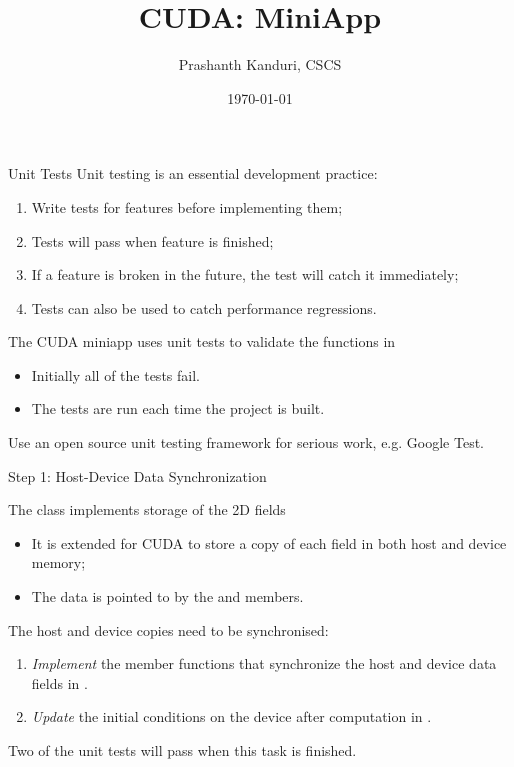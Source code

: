 \documentclass[aspectratio=43]{beamer}
\author{Prashanth Kanduri, CSCS}
\title{CUDA: MiniApp}
\subtitle{}
\date{\today}
\begin{document}
\cscstitle

\begin{frame}[fragile]{Unit Tests}
    Unit testing is an essential development practice:
    \begin{enumerate}
        \item Write tests for features before implementing them;
        \item Tests will pass when feature is finished;
        \item If a feature is broken in the future, the test will catch it immediately;
        \item Tests can also be used to catch performance regressions.
    \end{enumerate}
    The CUDA miniapp uses unit tests to validate the functions in 
    \begin{itemize}
        \item Initially all of the tests fail.
        \item The tests are run each time the project is built.
    \end{itemize}
    Use an open source unit testing framework for serious work, e.g. Google Test.
\end{frame}

\begin{frame}[fragile]{Step 1: Host-Device Data Synchronization}
    \begin{info}{The  class implements storage of the 2D fields}
        \begin{itemize}
            \item It is extended for CUDA to store a copy of each field in both host and device memory;
            \item The data is pointed to by the  and  members.
        \end{itemize}
    \end{info}
    The host and device copies need to be synchronised:
    \begin{enumerate}
        \item \emph{Implement} the member functions that synchronize the host and device data fields in .
        \item \emph{Update} the initial conditions on the device after computation in .
    \end{enumerate}
    \begin{info}{}
        Two of the unit tests will pass when this task is finished.
    \end{info}
\end{frame}
\end{document}
